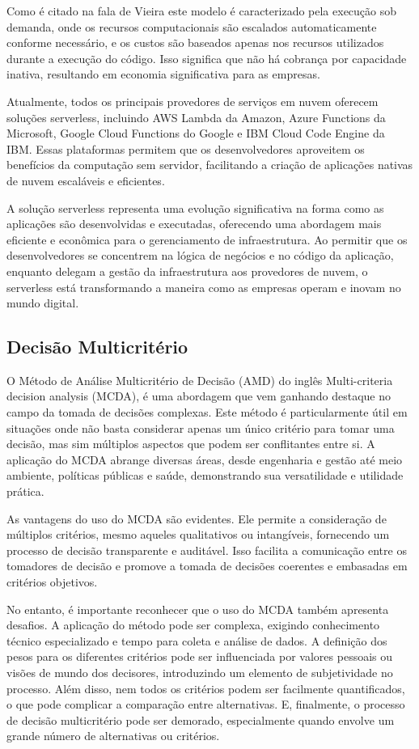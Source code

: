 \documentclass[12pt]{article}[abntex2]
\begin{document}
Como é citado na fala de Vieira \cite{gomes_computacao_2020} este modelo é caracterizado pela execução sob demanda, onde os recursos computacionais são escalados automaticamente conforme necessário, e os custos são baseados apenas nos recursos utilizados durante a execução do código. Isso significa que não há cobrança por capacidade inativa, resultando em economia significativa para as empresas.

Atualmente, todos os principais provedores de serviços em nuvem oferecem so\-luções serverless, incluindo AWS Lambda da Amazon, Azure Functions da Microsoft, Google Cloud Functions do Google e IBM Cloud Code Engine da IBM. Essas plataformas permitem que os desenvolvedores aproveitem os benefícios da computação sem servidor, facilitando a criação de aplicações nativas de nuvem escaláveis e eficientes.

A solução serverless representa uma evolução significativa na forma como as aplicações são desenvolvidas e executadas, oferecendo uma abordagem mais eficiente e econômica para o gerenciamento de infraestrutura. Ao permitir que os desenvolvedores se concentrem na lógica de negócios e no código da aplicação, enquanto delegam a gestão da infraestrutura aos provedores de nuvem, o serverless está transformando a maneira como as empresas operam e inovam no mundo digital.


\subsection{Decisão Multicritério}
O Método de Análise Multicritério de Decisão (AMD) do inglês Multi-criteria decision analysis (MCDA), é uma abordagem que vem ganhando destaque no campo da tomada de decisões complexas. Este método é particularmente útil em situações onde não basta considerar apenas um único critério para tomar uma decisão, mas sim múltiplos aspectos que podem ser conflitantes entre si. A aplicação do MCDA abrange diversas áreas, desde engenharia e gestão até meio ambiente, políticas públicas e saúde, demonstrando sua versatilidade e utilidade prática.

As vantagens do uso do MCDA são evidentes. Ele permite a consideração de múltiplos critérios, mesmo aqueles qualitativos ou intangíveis, fornecendo um processo de decisão transparente e auditável. Isso facilita a comunicação entre os tomadores de decisão e promove a tomada de decisões coerentes e embasadas em critérios objetivos.

No entanto, é importante reconhecer que o uso do MCDA também apresenta desafios. A aplicação do método pode ser complexa, exigindo conhecimento técnico especializado e tempo para coleta e análise de dados. A definição dos pesos para os diferentes critérios pode ser influenciada por valores pessoais ou visões de mundo dos decisores, introduzindo um elemento de subjetividade no processo. Além disso, nem todos os critérios podem ser facilmente quantificados, o que pode complicar a comparação entre alternativas. E, finalmente, o processo de decisão multicritério pode ser demorado, especialmente quando envolve um grande número de alternativas ou critérios.
\end{document}
